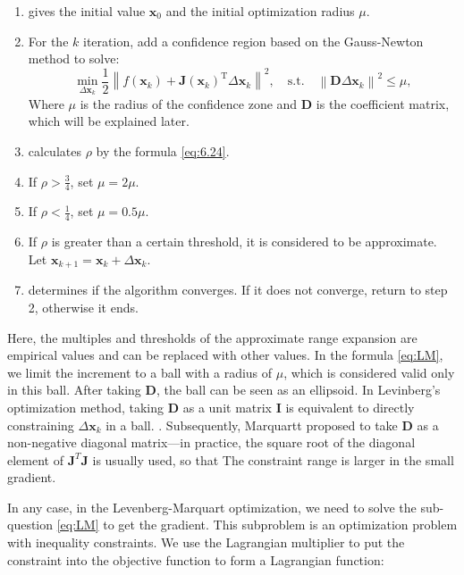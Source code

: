 \begin{mdframed}
	\begin{enumerate}
		\item gives the initial value $\bm{x}_0$ and the initial optimization radius $\mu$.
		\item For the $k$ iteration, add a confidence region based on the Gauss-Newton method to solve:
		\begin{equation}\label{eq:LM}
		\mathop {\min }\limits_{\Delta \bm{x}_k} \frac{1}{2}{\left\| {f\left( \bm{x}_k \right) + \bm{J} \left( \bm{x}_k \right)^\mathrm{T} \Delta \bm{x}_k} \right\|^2}, \quad \mathrm{s.t.}\quad {\left\| {\bm{D} \Delta \bm{x}_k} \right\|^2} \leqslant \mu ,
		\end{equation}
		Where $\mu$ is the radius of the confidence zone and $\bm{D}$ is the coefficient matrix, which will be explained later.
		\item calculates $\rho$ by the formula \eqref{eq:6.24}.
		\item If $\rho > \frac{3}{4}$, set $\mu = 2 \mu$.
		\item If $\rho < \frac{1}{4}$, set $\mu = 0.5 \mu$.
		\item If $\rho$ is greater than a certain threshold, it is considered to be approximate. Let $\bm{x}_{k+1} = \bm{x}_k+\Delta \bm{x}_k$.
		\item determines if the algorithm converges. If it does not converge, return to step 2, otherwise it ends.
	\end{enumerate}
\end{mdframed}

Here, the multiples and thresholds of the approximate range expansion are empirical values and can be replaced with other values. In the formula \eqref{eq:LM}, we limit the increment to a ball with a radius of $\mu$, which is considered valid only in this ball. After taking $\bm{D}$, the ball can be seen as an ellipsoid. In Levinberg's optimization method, taking $\bm{D}$ as a unit matrix $\bm{I}$ is equivalent to directly constraining $\Delta \bm{x}_k$ in a ball. . Subsequently, Marquartt proposed to take $\bm{D}$ as a non-negative diagonal matrix—in practice, the square root of the diagonal element of $\bm{J}^T \bm{J}$ is usually used, so that The constraint range is larger in the small gradient.

In any case, in the Levenberg-Marquart optimization, we need to solve the sub-question \eqref{eq:LM} to get the gradient. This subproblem is an optimization problem with inequality constraints. We use the Lagrangian multiplier to put the constraint into the objective function to form a Lagrangian function:

